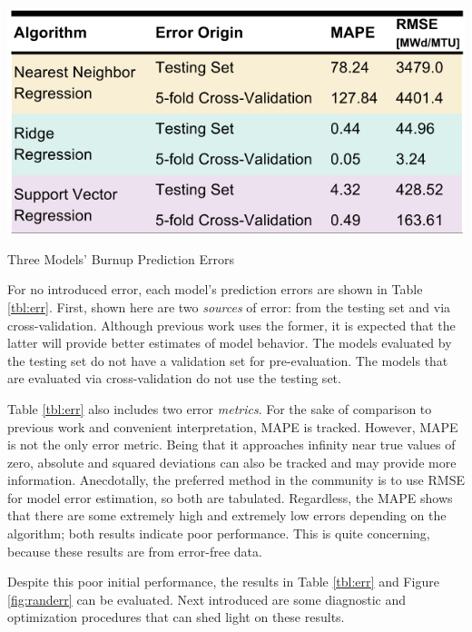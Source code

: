 \begin{table}[!htb]
  \centering
  \includegraphics[width=0.8\linewidth]{./chapters/demo_method/results1.png}
  \caption{Three Models' Burnup Prediction Errors}
  \label{tbl:err}
\end{table}

For no introduced error, each model's prediction errors are shown in Table
\ref{tbl:err}.  First, shown here are two \textit{sources} of error: from the
testing set and via cross-validation.  Although previous work uses the former,
it is expected that the latter will provide better estimates of model behavior.
The models evaluated by the testing set do not have a validation set for
pre-evaluation.  The models that are evaluated via cross-validation do not use
the testing set. 

Table \ref{tbl:err} also includes two error \textit{metrics}.  For the sake of
comparison to previous work and convenient interpretation, \gls{MAPE} is
tracked. However, \gls{MAPE} is not the only error metric. Being that it
approaches infinity near true values of zero, absolute and squared deviations
can also be tracked and may provide more information.  Anecdotally, the
preferred method in the community is to use \gls{RMSE} for model error
estimation, so both are tabulated.  Regardless, the \gls{MAPE} shows that there
are some extremely high and extremely low errors depending on the algorithm;
both results indicate poor performance.  This is quite concerning, because
these results are from error-free data.

Despite this poor initial performance, the results in Table \ref{tbl:err} and
Figure \ref{fig:randerr} can be evaluated. Next introduced are some diagnostic
and optimization procedures that can shed light on these results.
